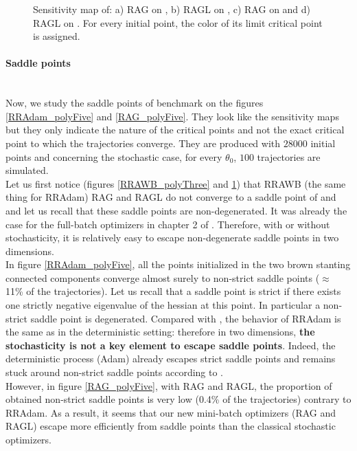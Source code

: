 \begin{figure}[h!]
	\centering
	\scalebox{0.45}{}
	\caption{Sensitivity map of: a) RAG on \polyTwo, b) RAGL on \polyTwo, c) RAG on \polyThree and d) RAGL on \polyThree.
	For every initial point, the color of its limit critical point is assigned.}
	\label{RAG_stabilite}
\end{figure}

\paragraph{Saddle points}
~~\\
Now, we study the saddle points of benchmark \polyFive on the figures \ref{RRAdam_polyFive} and \ref{RAG_polyFive}. They look like the sensitivity maps but they only indicate the nature of the critical points and not the exact critical point to which the trajectories converge. They are produced with $28000$ initial points and concerning the stochastic case, for every $\theta_0$, $100$ trajectories are simulated.\\
Let us first notice (figures \ref{RRAWB_polyThree} and \ref{RAG_stabilite}) that RRAWB (the same thing for RRAdam) RAG and RAGL do not converge to a saddle point of \polyTwo and \polyThree and let us recall that these saddle points are non-degenerated. It was already the case for the full-batch optimizers in chapter 2 of \cite{Bilel_thesis}. Therefore, with or without stochasticity, it is relatively easy to escape non-degenerate saddle points in two dimensions. \\
In figure \ref{RRAdam_polyFive}, all the points initialized in the two brown stanting connected components converge almost surely to non-strict saddle points ($\approx$ 11\% of the trajectories). Let us recall that a saddle point is strict if there exists one strictly negative eigenvalue of the hessian at this point. In particular a non-strict saddle point is degenerated. Compared with \cite{Bilel}, the behavior of RRAdam is the same as in the deterministic setting: therefore in two dimensions, \textbf{the stochasticity is not a key element to escape saddle points}. Indeed, the deterministic process (Adam) already escapes strict saddle points and remains stuck around non-strict saddle points according to \cite{Bilel}. \\
However, in figure \ref{RAG_polyFive}, with RAG and RAGL, the proportion of obtained non-strict saddle points is very low (0.4\% of the trajectories) contrary to RRAdam. As a result, it seems that our new mini-batch optimizers (RAG and RAGL) escape more efficiently from saddle points than the classical stochastic optimizers.    

